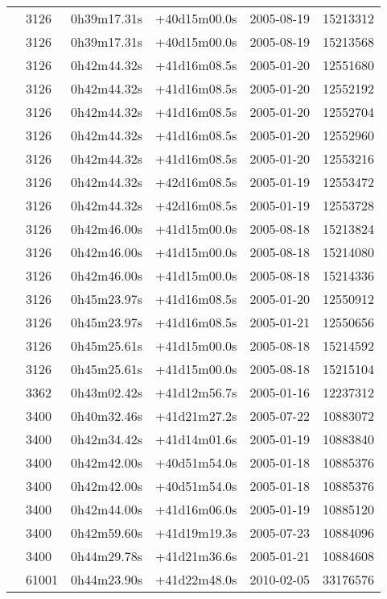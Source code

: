 \begin{table*}
\begin{center}
\begin{tabular}{llllll}
   & 3126 & 0h39m17.31s & +40d15m00.0s & 2005-08-19 & 15213312\\
   & 3126 & 0h39m17.31s & +40d15m00.0s & 2005-08-19 & 15213568\\
   & 3126 & 0h42m44.32s & +41d16m08.5s & 2005-01-20 & 12551680\\
   & 3126 & 0h42m44.32s & +41d16m08.5s & 2005-01-20 & 12552192\\
   & 3126 & 0h42m44.32s & +41d16m08.5s & 2005-01-20 & 12552704\\
   & 3126 & 0h42m44.32s & +41d16m08.5s & 2005-01-20 & 12552960\\
   & 3126 & 0h42m44.32s & +41d16m08.5s & 2005-01-20 & 12553216\\
   & 3126 & 0h42m44.32s & +42d16m08.5s & 2005-01-19 & 12553472\\
   & 3126 & 0h42m44.32s & +42d16m08.5s & 2005-01-19 & 12553728\\
   & 3126 & 0h42m46.00s & +41d15m00.0s & 2005-08-18 & 15213824\\
   & 3126 & 0h42m46.00s & +41d15m00.0s & 2005-08-18 & 15214080\\
   & 3126 & 0h42m46.00s & +41d15m00.0s & 2005-08-18 & 15214336\\
   & 3126 & 0h45m23.97s & +41d16m08.5s & 2005-01-20 & 12550912\\
   & 3126 & 0h45m23.97s & +41d16m08.5s & 2005-01-21 & 12550656\\
   & 3126 & 0h45m25.61s & +41d15m00.0s & 2005-08-18 & 15214592\\
   & 3126 & 0h45m25.61s & +41d15m00.0s & 2005-08-18 & 15215104\\
   & 3362 & 0h43m02.42s & +41d12m56.7s & 2005-01-16 & 12237312\\
   & 3400 & 0h40m32.46s & +41d21m27.2s & 2005-07-22 & 10883072\\
   & 3400 & 0h42m34.42s & +41d14m01.6s & 2005-01-19 & 10883840\\
   & 3400 & 0h42m42.00s & +40d51m54.0s & 2005-01-18 & 10885376\\
   & 3400 & 0h42m42.00s & +40d51m54.0s & 2005-01-18 & 10885376\\
   & 3400 & 0h42m44.00s & +41d16m06.0s & 2005-01-19 & 10885120\\
   & 3400 & 0h42m59.60s & +41d19m19.3s & 2005-07-23 & 10884096\\
   & 3400 & 0h44m29.78s & +41d21m36.6s & 2005-01-21 & 10884608\\
   & 61001 & 0h44m23.90s & +41d22m48.0s & 2010-02-05 & 33176576\\

\end{tabular}
\end{center}
\end{table*}
